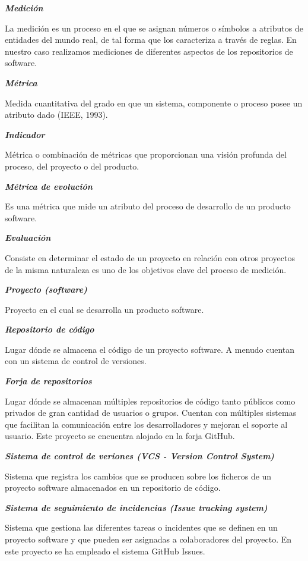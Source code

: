\textbf{\textit{Medición}}

La medición es un proceso en el que se asignan números o símbolos a atributos de entidades del mundo real, de tal forma que los caracteriza a través de reglas. En nuestro caso realizamos mediciones de diferentes aspectos de los repositorios de software.

\textbf{\textit{Métrica}}

Medida cuantitativa del grado en que un sistema, componente o proceso posee un atributo dado (IEEE, 1993).

\textbf{\textit{Indicador}}

Métrica o combinación de métricas que proporcionan una visión profunda del proceso, del proyecto o del producto.

\textbf{\textit{Métrica de evolución}}

Es una métrica que mide un atributo del proceso de desarrollo de un producto software.

\textbf{\textit{Evaluación}}

Consiste en determinar el estado de un proyecto en relación con otros proyectos de la misma naturaleza es uno de los objetivos clave del proceso de medición.

\textbf{\textit{Proyecto (software)}}

Proyecto en el cual se desarrolla un producto software.

\textbf{\textit{Repositorio de código}}

Lugar dónde se almacena el código de un proyecto software. A menudo cuentan con un sistema de control de versiones.

\textbf{\textit{Forja de repositorios}}

Lugar dónde se almacenan múltiples repositorios de código tanto públicos como privados de gran cantidad de usuarios o grupos. Cuentan con múltiples sistemas que facilitan la comunicación entre los desarrolladores y mejoran el soporte al usuario. Este proyecto se encuentra alojado en la forja GitHub.

\textbf{\textit{Sistema de control de veriones (VCS - Version Control System)}}

Sistema que registra los cambios que se producen sobre los ficheros de un proyecto software almacenados en un repositorio de código.

\textbf{\textit{Sistema de seguimiento de incidencias (Issue tracking system)}}

Sistema que gestiona las diferentes tareas o incidentes que se definen en un proyecto software y que pueden ser asignadas a colaboradores del proyecto. En este proyecto se ha empleado el sistema GitHub Issues.

